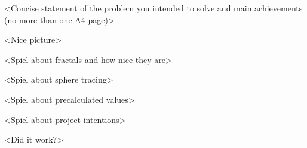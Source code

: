 <Concise statement of the problem you intended to solve and main achievements (no more than one A4 page)>

<Nice picture>

<Spiel about fractals and how nice they are>

<Spiel about sphere tracing>

<Spiel about precalculated values>

<Spiel about project intentions>

<Did it work?>
